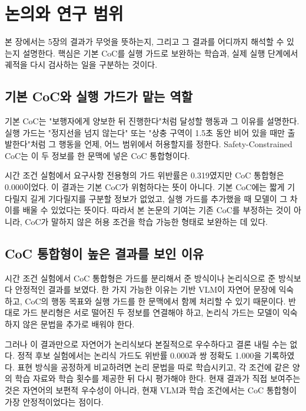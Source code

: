 \section{논의와 연구 범위}
\label{sec:discussion}

본 장에서는 5장의 결과가 무엇을 뜻하는지, 그리고 그 결과를 어디까지 해석할 수 있는지 설명한다. 핵심은 기본 CoC를 실행 가드로 보완하는 학습과, 실제 실행 단계에서 궤적을 다시 검사하는 일을 구분하는 것이다.

\subsection{기본 CoC와 실행 가드가 맡는 역할}

기본 CoC는 "보행자에게 양보한 뒤 진행한다"처럼 달성할 행동과 그 이유를 설명한다. 실행 가드는 "정지선을 넘지 않는다" 또는 "상충 구역이 1.5초 동안 비어 있을 때만 출발한다"처럼 그 행동을 언제, 어느 범위에서 허용할지를 정한다. Safety-Constrained CoC는 이 두 정보를 한 문맥에 넣은 CoC 통합형이다.

시간 조건 실험에서 요구사항 전용형의 가드 위반률은 0.319였지만 CoC 통합형은 0.000이었다. 이 결과는 기본 CoC가 위험하다는 뜻이 아니다. 기본 CoC에는 짧게 기다릴지 길게 기다릴지를 구분할 정보가 없었고, 실행 가드를 추가했을 때 모델이 그 차이를 배울 수 있었다는 뜻이다. 따라서 본 논문의 기여는 기존 CoC를 부정하는 것이 아니라, CoC가 말하지 않은 허용 조건을 학습 가능한 형태로 보완하는 데 있다.

\subsection{CoC 통합형이 높은 결과를 보인 이유}

시간 조건 실험에서 CoC 통합형은 가드를 분리해서 준 방식이나 논리식으로 준 방식보다 안정적인 결과를 보였다. 한 가지 가능한 이유는 기반 VLM이 자연어 문장에 익숙하고, CoC의 행동 목표와 실행 가드를 한 문맥에서 함께 처리할 수 있기 때문이다. 반대로 가드 분리형은 서로 떨어진 두 정보를 연결해야 하고, 논리식 가드는 모델이 익숙하지 않은 문법을 추가로 배워야 한다.

그러나 이 결과만으로 자연어가 논리식보다 본질적으로 우수하다고 결론 내릴 수는 없다. 정적 후보 실험에서는 논리식 가드도 위반률 0.000과 쌍 정확도 1.000을 기록하였다. 표현 방식을 공정하게 비교하려면 논리 문법을 따로 학습시키고, 각 조건에 같은 양의 학습 자료와 학습 횟수를 제공한 뒤 다시 평가해야 한다. 현재 결과가 직접 보여주는 것은 자연어의 보편적 우수성이 아니라, 현재 VLM과 학습 조건에서는 CoC 통합형이 가장 안정적이었다는 점이다.

